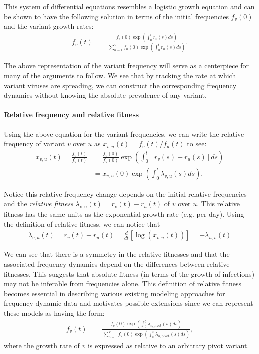\documentclass[11pt,oneside,letterpaper]{article}
\begin{document}
This system of differential equations resembles a logistic growth equation and can be shown to have the following solution in terms of the initial frequencies $f_{v}(0)$ and the variant growth rates:
\begin{align}
    f_{v}(t) &= \frac{ f_{v}(0) \exp( \int_{0}^{t} r_{v}(s) ds)}{\sum_{u=1}^{V}  f_{u}(0) \exp( \int_{0}^{t} r_{u}(s) ds)}.
\end{align}

The above representation of the variant frequency will serve as a centerpiece for many of the arguments to follow.
We see that by tracking the rate at which variant viruses are spreading, we can construct the corresponding frequency dynamics without knowing the absolute prevalence of any variant.

\paragraph{Relative frequency and relative fitness}%

Using the above equation for the variant frequencies, we can write the relative frequency of variant $v$ over $u$ as $x_{v,u}(t) = f_{v}(t) / f_{u}(t)$ to see:
\begin{align*}
    x_{v, u}(t) = \frac{f_{v}(t)}{f_{u}(t)} &= \frac{f_{v}(0)}{f_{u}(0)} \exp \left( \int_{0}^{t} [r_{v}(s) - r_{u}(s)] ds \right)\\
                                            &=x_{v,u}(0)\exp \left( \int_{0}^{t} \lambda_{v,u}(s) ds \right).
\end{align*}

Notice this relative frequency change depends on the initial relative frequencies and the \emph{relative fitness} $\lambda_{v,u}(t) = r_{v}(t) - r_{u}(t)$ of $v$ over $u$.
This relative fitness has the same units as the exponential growth rate (e.g. per day).
Using the definition of relative fitness, we can notice that
\begin{align}
\lambda_{v, u}(t) = r_{v}(t) - r_{u}(t) = \frac{d }{d t} \left[\log \left( x_{v,u}(t) \right) \right] = - \lambda_{u,v}(t)
\end{align}

We can see that there is a symmetry in the relative fitnesses and that the associated frequency dynamics depend on the differences between relative fitnesses.
This suggests that absolute fitness (in terms of the growth of infections) may not be inferable from frequencies alone.
This definition of relative fitness becomes essential in describing various existing modeling approaches for frequency dynamic data and motivates possible extensions since we can represent these models as having the form:
\begin{align}
    f_{v}(t) &= \frac{ f_{v}(0) \exp( \int_{0}^{t} \lambda_{v, \text{pivot}}(s) ds)}{\sum_{u=1}^{V}  f_{u}(0) \exp( \int_{0}^{t} \lambda_{u, \text{pivot}}(s) ds)},
\end{align}
where the growth rate of $v$ is expressed as relative to an arbitrary pivot variant.
\end{document}
